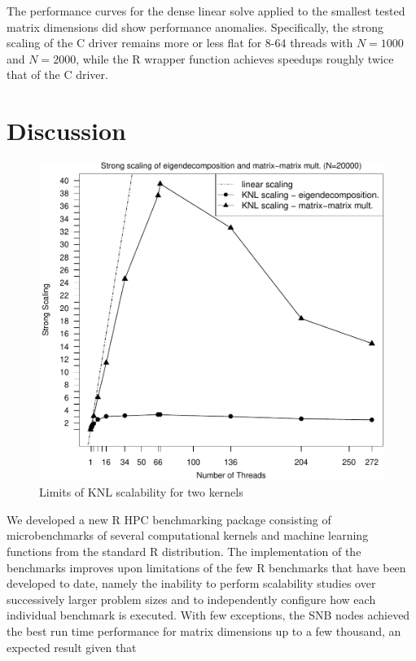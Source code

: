 The performance curves for the dense linear solve applied to the smallest tested matrix
dimensions did show performance anomalies.
Specifically, the strong scaling of the C driver remains more or less flat for 8-64 threads with
$N=1000$ and $N=2000$, while the R wrapper function achieves speedups roughly twice that of the
C driver.

\section{Discussion} \label{sec:discuss}
\begin{figure}
\includegraphics[height=\columnwidth, width=\columnwidth]{eigen_matmat_20000_272_knl-ss.pdf}
\caption{Limits of KNL scalability for two kernels}
\label{fig:knlScalabilityLimits}
\end{figure}
We developed a new R HPC benchmarking package consisting of microbenchmarks of several
computational kernels and machine learning functions from the standard R
distribution. The implementation of the benchmarks improves upon limitations of the few R
benchmarks that have been developed to date, namely the inability to perform scalability
studies over successively larger problem sizes and to independently configure how each
individual benchmark is executed. With few exceptions, the SNB nodes achieved the best run
time performance for matrix dimensions up to a few thousand, an expected result given that
